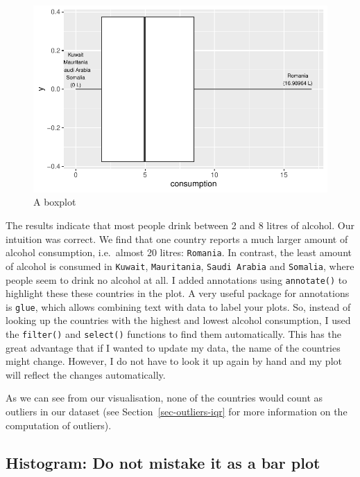 \documentclass[
  letterpaper,
]{krantz}
\begin{document}
\begin{figure}[H]

{\centering \includegraphics{08_descriptive_statistics_files/figure-latex/a-boxplot-1.pdf}

}

\caption{A boxplot}

\end{figure}%

The results indicate that most people drink between 2 and 8 litres of
alcohol. Our intuition was correct. We find that one country reports a
much larger amount of alcohol consumption, i.e.~almost 20 litres:
\texttt{Romania}. In contrast, the least amount of alcohol is consumed
in \texttt{Kuwait}, \texttt{Mauritania}, \texttt{Saudi\ Arabia} and
\texttt{Somalia}, where people seem to drink no alcohol at all. I added
annotations using \texttt{annotate()} to highlight these these countries
in the plot. A very useful package for annotations is \texttt{glue},
which allows combining text with data to label your plots. So, instead
of looking up the countries with the highest and lowest alcohol
consumption, I used the \texttt{filter()} and \texttt{select()}
functions to find them automatically. This has the great advantage that
if I wanted to update my data, the name of the countries might change.
However, I do not have to look it up again by hand and my plot will
reflect the changes automatically.

As we can see from our visualisation, none of the countries would count
as outliers in our dataset (see Section~\ref{sec-outliers-iqr} for more
information on the computation of outliers).

\subsection{Histogram: Do not mistake it as a bar
plot}\label{sec-histograms}
\end{document}
